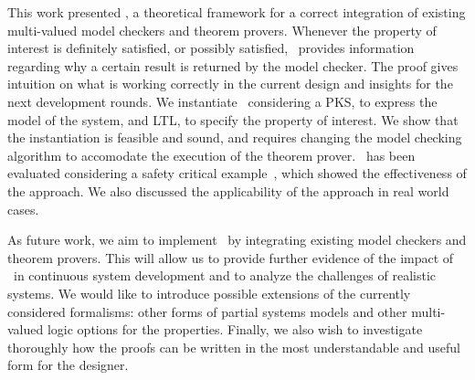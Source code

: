 This work presented \NAME, a theoretical framework for a correct integration of existing multi-valued model checkers and theorem provers. 
Whenever the property of interest is definitely satisfied, or possibly satisfied, \NAME\ provides  information regarding why a certain result is returned by the model checker.
The proof gives intuition on what is working correctly in the current design and insights for the next development rounds.
We instantiate \NAME\ considering a PKS, to express the model of the system, and LTL, to specify the property of interest. 
We show that the instantiation is feasible and sound, and requires changing the model checking algorithm to accomodate the execution of the theorem prover.
\NAME\ has been evaluated considering a safety critical example~\cite{arcaini2015formal}, which showed  the effectiveness  of the approach. 
We also discussed the applicability of the approach in real world cases.

As future work, we aim to implement \NAME\ by integrating existing model checkers and theorem provers. 
This  will allow us to provide further evidence of the impact of \NAME\ in continuous system development and to analyze the challenges of realistic systems.
We would like to introduce possible extensions of the currently considered formalisms: other forms of partial systems models and other multi-valued logic options for the properties.
Finally, we also wish to investigate thoroughly how the proofs can be written in the most understandable and useful form for the designer.

